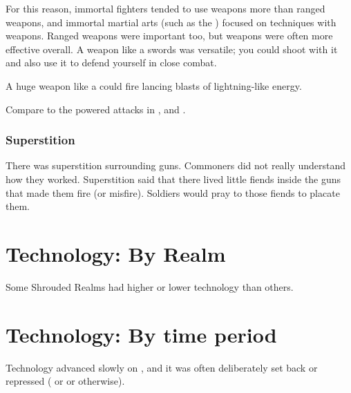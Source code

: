 For this reason, immortal fighters tended to use \melee weapons more than ranged weapons, and immortal martial arts (such as the ) focused on techniques with \melee weapons.
Ranged weapons were important too, but \melee weapons were often more effective overall.
A \melee weapon like a swords was versatile; you could shoot with it and also use it to defend yourself in close combat. 

A huge weapon like a \senaan could fire lancing blasts of lightning-like energy. 

Compare to the powered attacks in \cite{VideoGame:FinalFantasyVII}, \cite{Anime:FinalFantasyVII:LastOrder} and \cite{Anime:FinalFantasyVII:AdventChildren}. 





\subsubsection{Superstition}
There was superstition surrounding guns. 
Commoners did not really understand how they worked. 
Superstition said that there lived little fiends inside the guns that made them fire (or misfire).
Soldiers would pray to those fiends to placate them. 















\section{Technology: By Realm}
Some Shrouded Realms had higher or lower technology than others.














\section{Technology: By time period}
Technology advanced slowly on \Miith{}, and it was often deliberately set back or repressed ( or  or otherwise). 







